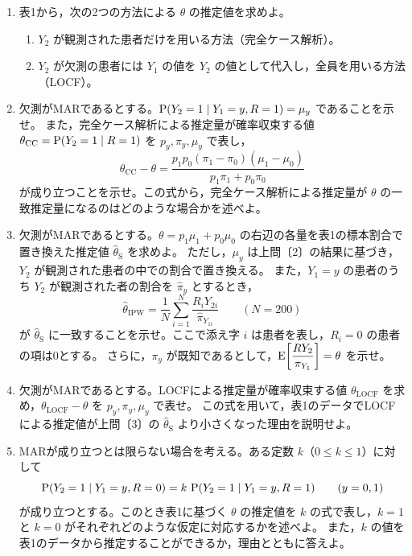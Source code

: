 \documentclass[a4paper,10pt]{ltjsarticle}
\begin{document}
\begin{enumerate}
\item 表1から，次の2つの方法による $\theta$ の推定値を求めよ。
\begin{enumerate}[label=(\alph*),leftmargin=2em,itemsep=0.2em,topsep=0.2em]
\item $Y_2$ が観測された患者だけを用いる方法（完全ケース解析）。
\item $Y_2$ が欠測の患者には $Y_1$ の値を $Y_2$ の値として代入し，全員を用いる方法（LOCF）。
\end{enumerate}
\item 欠測がMARであるとする。$\operatorname{P}(Y_2=1\mid Y_1=y,R=1)=\mu_y$ であることを示せ。
また，完全ケース解析による推定量が確率収束する値 $\theta_{\mathrm{CC}}=\operatorname{P}(Y_2=1\mid R=1)$ を $p_y,\pi_y,\mu_y$ で表し，
\[
\theta_{\mathrm{CC}}-\theta=\frac{p_1p_0(\pi_1-\pi_0)(\mu_1-\mu_0)}{p_1\pi_1+p_0\pi_0}
\]
が成り立つことを示せ。この式から，完全ケース解析による推定量が $\theta$ の一致推定量になるのはどのような場合かを述べよ。
\item 欠測がMARであるとする。$\theta=p_1\mu_1+p_0\mu_0$ の右辺の各量を表1の標本割合で置き換えた推定値 $\hat\theta_{\mathrm S}$ を求めよ。
ただし，$\mu_y$ は上問〔2〕の結果に基づき，$Y_2$ が観測された患者の中での割合で置き換える。
また，$Y_1=y$ の患者のうち $Y_2$ が観測された者の割合を $\hat\pi_y$ とするとき，
\[
\hat\theta_{\mathrm{IPW}}=\frac1N\sum_{i=1}^{N}\frac{R_iY_{2i}}{\hat\pi_{Y_{1i}}}\qquad(N=200)
\]
が $\hat\theta_{\mathrm S}$ に一致することを示せ。ここで添え字 $i$ は患者を表し，$R_i=0$ の患者の項は0とする。
さらに，$\pi_y$ が既知であるとして，$\operatorname{E}\!\left[\dfrac{RY_2}{\pi_{Y_1}}\right]=\theta$ を示せ。
\item 欠測がMARであるとする。LOCFによる推定量が確率収束する値 $\theta_{\mathrm{LOCF}}$ を求め，$\theta_{\mathrm{LOCF}}-\theta$ を $p_y,\pi_y,\mu_y$ で表せ。
この式を用いて，表1のデータでLOCFによる推定値が上問〔3〕の $\hat\theta_{\mathrm S}$ より小さくなった理由を説明せよ。
\item MARが成り立つとは限らない場合を考える。ある定数 $k$（$0\le k\le1$）に対して
\[
\operatorname{P}(Y_2=1\mid Y_1=y,R=0)=k\,\operatorname{P}(Y_2=1\mid Y_1=y,R=1)\qquad(y=0,1)
\]
が成り立つとする。このとき表1に基づく $\theta$ の推定値を $k$ の式で表し，$k=1$ と $k=0$ がそれぞれどのような仮定に対応するかを述べよ。
また，$k$ の値を表1のデータから推定することができるか，理由とともに答えよ。
\end{enumerate}
\newpage
\end{document}
